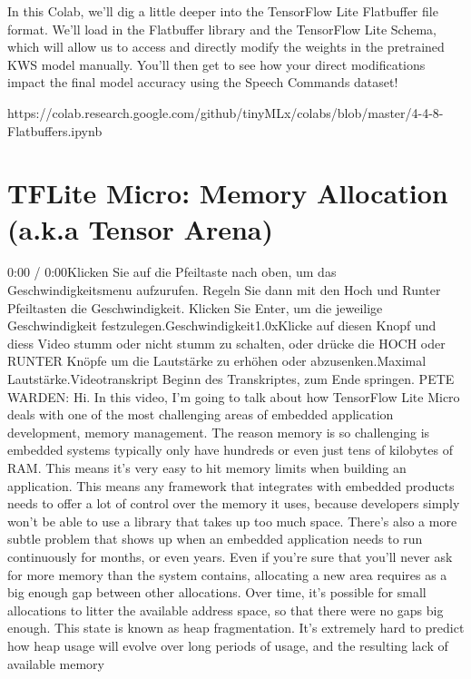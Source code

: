   In this Colab, we’ll dig a little deeper into the TensorFlow Lite Flatbuffer file format. We’ll load in the Flatbuffer library and the TensorFlow Lite Schema, which will allow us to access and directly modify the weights in the pretrained KWS model manually. You’ll then get to see how your direct modifications impact the final model accuracy using the Speech Commands dataset!
  
  https://colab.research.google.com/github/tinyMLx/colabs/blob/master/4-4-8-Flatbuffers.ipynb
 
 \section{TFLite Micro: Memory Allocation (a.k.a Tensor Arena)}
 
 
     0:00 / 0:00Klicken Sie auf die Pfeiltaste nach oben, um das Geschwindigkeitsmenu aufzurufen. Regeln Sie dann mit den Hoch und Runter Pfeiltasten die Geschwindigkeit. Klicken Sie Enter, um die jeweilige Geschwindigkeit festzulegen.Geschwindigkeit1.0xKlicke auf diesen Knopf und diess Video stumm oder nicht stumm zu schalten, oder drücke die HOCH oder RUNTER Knöpfe um die Lautstärke zu erhöhen oder abzusenken.Maximal Lautstärke.Videotranskript
     Beginn des Transkriptes, zum Ende springen.
     PETE WARDEN: Hi.
     In this video, I'm going to talk about how TensorFlow Lite Micro deals
     with one of the most challenging areas of embedded application
     development, memory management.
     The reason memory is so challenging is embedded systems
     typically only have hundreds or even just tens of kilobytes of RAM.
     This means it's very easy to hit memory limits when building an application.
     This means any framework that integrates with embedded products
     needs to offer a lot of control over the memory it uses,
     because developers simply won't be able to use
     a library that takes up too much space.
     There's also a more subtle problem that shows up
     when an embedded application needs to run continuously for months, or even
     years.
     Even if you're sure that you'll never ask for more memory
     than the system contains, allocating a new area
     requires as a big enough gap between other allocations.
     Over time, it's possible for small allocations
     to litter the available address space, so that there were no gaps big enough.
     This state is known as heap fragmentation.
     It's extremely hard to predict how heap usage will evolve over
     long periods of usage, and the resulting lack of available memory
